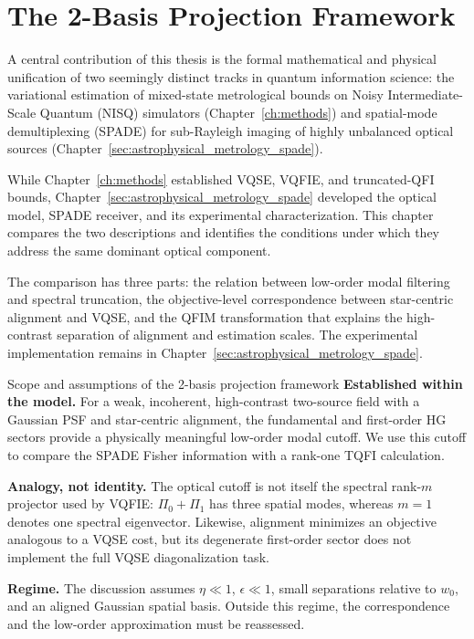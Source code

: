 \chapter{The 2-Basis Projection Framework}
\label{ch:bridging_metrology_imaging}

A central contribution of this thesis is the formal mathematical and physical unification of two seemingly distinct tracks in quantum information science: the variational estimation of mixed-state metrological bounds on Noisy Intermediate-Scale Quantum (NISQ) simulators (Chapter~\ref{ch:methods}) and spatial-mode demultiplexing (SPADE) for sub-Rayleigh imaging of highly unbalanced optical sources (Chapter~\ref{sec:astrophysical_metrology_spade}).

While Chapter~\ref{ch:methods} established VQSE, VQFIE, and truncated-QFI bounds, Chapter~\ref{sec:astrophysical_metrology_spade} developed the optical model, SPADE receiver, and its experimental characterization. This chapter compares the two descriptions and identifies the conditions under which they address the same dominant optical component.

The comparison has three parts: the relation between low-order modal filtering and spectral truncation, the objective-level correspondence between star-centric alignment and VQSE, and the QFIM transformation that explains the high-contrast separation of alignment and estimation scales. The experimental implementation remains in Chapter~\ref{sec:astrophysical_metrology_spade}.

\begin{infobox}{Scope and assumptions of the 2-basis projection framework}
    \textbf{Established within the model.} For a weak, incoherent, high-contrast two-source field with a Gaussian PSF and star-centric alignment, the fundamental and first-order HG sectors provide a physically meaningful low-order modal cutoff. We use this cutoff to compare the SPADE Fisher information with a rank-one TQFI calculation.

    \textbf{Analogy, not identity.} The optical cutoff is not itself the spectral rank-$m$ projector used by VQFIE: $\Pi_0+\Pi_1$ has three spatial modes, whereas $m=1$ denotes one spectral eigenvector. Likewise, alignment minimizes an objective analogous to a VQSE cost, but its degenerate first-order sector does not implement the full VQSE diagonalization task.

    \textbf{Regime.} The discussion assumes $\eta \ll 1$, $\epsilon \ll 1$, small separations relative to $w_0$, and an aligned Gaussian spatial basis. Outside this regime, the correspondence and the low-order approximation must be reassessed.
\end{infobox}

